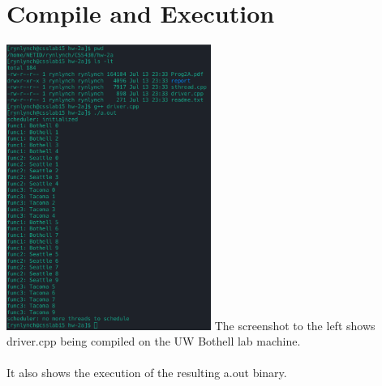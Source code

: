 \documentclass[a4paper,11pt,twoside]{article}
\begin{document}
\section*{Compile and Execution}
\label{sec:org38754b0}
\begin{multicols}{2}
\noindent
\includegraphics[width=0.5\textwidth]{compile-execution}
\vfill\null
\columnbreak
\noindent
The screenshot to the left shows driver.cpp being compiled on the UW Bothell lab machine.\\
\\
It also shows the execution of the resulting a.out binary.\\
\end{multicols}
\end{document}
